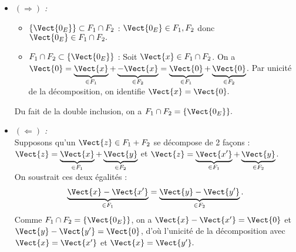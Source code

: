 \documentclass{book}
\begin{document}
\begin{Demonstration}$\quad $\\
\label{Proof:critere2}
\begin{itemize}
\item \textit{$(\Longrightarrow)$ :}
\begin{itemize}[label=*]
\item \textit{$\{\Vect{0_E}\}   \subset  F_1\cap F_2$} :
$\Vect{0_E}\in F_1,F_2$ donc $\Vect{0_E}\in F_1\cap F_2 .$ 
\item \textit{$F_1\cap F_2  \subset \{\Vect{0_E}\} $} :
Soit $\Vect{x}\in F_1\cap F_2$. 
On a $\Vect{0}= \underbrace{\Vect{x}}_{\in F_1} + \underbrace{-\Vect{x}}_{\in F_2}= \underbrace{\Vect{0}}_{\in F_1} + \underbrace{\Vect{0}}_{\in F_2}$. Par unicité de la décomposition, on identifie $\Vect{x}=\Vect{0}.$
\end{itemize}
Du fait de la double inclusion, on a $F_1\cap F_2 = \{\Vect{0_E}\}.$\\
\item \textit{$(\Longleftarrow)$ :}\\
Supposons qu'un $\Vect{z} \in F_1+F_2$  se décompose de 2 façons :$\Vect{z}= \underbrace{\Vect{x}}_{\in F_1} + \underbrace{\Vect{y}}_{\in F_2}$ et $\Vect{z}= \underbrace{\Vect{x'}}_{\in F_1} + \underbrace{\Vect{y}}_{\in F_2}$. \\
On soustrait ces deux égalités :
$$\underbrace{\Vect{x} -\Vect{x'} }_{\in F_1}=\underbrace{\Vect{y} -\Vect{y'} }_{\in F_2}.$$
Comme $F_1\cap F_2 = \{\Vect{0_E}\}$, on a $\Vect{x} -\Vect{x'}=\Vect{0}$ et $\Vect{y} -\Vect{y'} =\Vect{0}$, d'où l'unicité de la décomposition avec $\Vect{x} =\Vect{x'}$ et $\Vect{x}=\Vect{y'}.$
\end{itemize}

\end{Demonstration}
\end{document}
